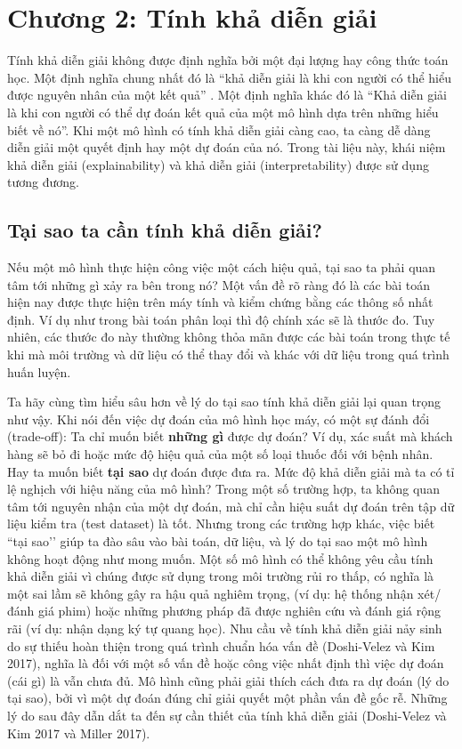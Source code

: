 \chapter*{Chương 2: Tính khả diễn giải}
Tính khả diễn giải không được định nghĩa bởi một đại lượng hay công thức toán học. Một định nghĩa chung nhất đó là ``khả diễn giải là khi con người có thể hiểu được nguyên nhân của một kết quả'' . Một định nghĩa khác đó là ``Khả diễn giải là khi con người có thể dự đoán kết quả của một mô hình dựa trên những hiểu biết về nó''. Khi một mô hình có tính khả diễn giải càng cao, ta càng dễ dàng diễn giải một quyết định hay một dự đoán của nó. Trong tài liệu này, khái niệm khả diễn giải (explainability) và khả diễn giải (interpretability) được sử dụng tương đương.

\clearpage

\section{Tại sao ta cần tính khả diễn giải?}
Nếu một mô hình thực hiện công việc một cách hiệu quả, tại sao ta phải quan tâm tới những gì xảy ra bên trong nó? Một vấn đề rõ ràng đó là các bài toán hiện nay được thực hiện trên máy tính và kiểm chứng bằng các thông số nhất định. Ví dụ như trong bài toán phân loại thì độ chính xác sẽ là thước đo. Tuy nhiên, các thước đo này thường không thỏa mãn được các bài toán trong thực tế khi mà môi trường và dữ liệu có thể thay đổi và khác với dữ liệu trong quá trình huấn luyện.

Ta hãy cùng tìm hiểu sâu hơn về lý do tại sao tính khả diễn giải lại quan trọng như vậy. Khi nói đến việc dự đoán của mô hình học máy, có một sự đánh đổi (trade-off): Ta chỉ muốn biết \textbf{những gì} được dự đoán? Ví dụ, xác suất mà khách hàng sẽ bỏ đi hoặc mức độ hiệu quả của một số loại thuốc đối với bệnh nhân. Hay ta muốn biết \textbf{tại sao} dự đoán được đưa ra. Mức độ khả diễn giải mà ta có tỉ lệ nghịch với hiệu năng của mô hình? Trong một số trường hợp, ta không quan tâm tới nguyên nhận của một dự đoán, mà chỉ cần hiệu suất dự đoán trên tập dữ liệu kiểm tra (test dataset) là tốt. Nhưng trong các trường hợp khác, việc biết ``tại sao’’ giúp ta đào sâu vào bài toán, dữ liệu, và lý do tại sao một mô hình không hoạt động như mong muốn. Một số mô hình có thể không yêu cầu tính khả diễn giải vì chúng được sử dụng trong môi trường rủi ro thấp, có nghĩa là một sai lầm sẽ không gây ra hậu quả nghiêm trọng, (ví dụ: hệ thống nhận xét/ đánh giá phim) hoặc những phương pháp đã được nghiên cứu và đánh giá rộng rãi (ví dụ: nhận dạng ký tự quang học). Nhu cầu về tính khả diễn giải nảy sinh do sự thiếu hoàn thiện trong quá trình chuẩn hóa vấn đề (Doshi-Velez và Kim 2017), nghĩa là đối với một số vấn đề hoặc công việc nhất định thì việc dự đoán (cái gì) là vẫn chưa đủ. Mô hình cũng phải giải thích cách đưa ra dự đoán (lý do tại sao), bởi vì một dự đoán đúng chỉ giải quyết một phần vấn đề gốc rễ. Những lý do sau đây dẫn dắt ta đến sự cần thiết của tính khả diễn giải (Doshi-Velez và Kim 2017 và Miller 2017).

